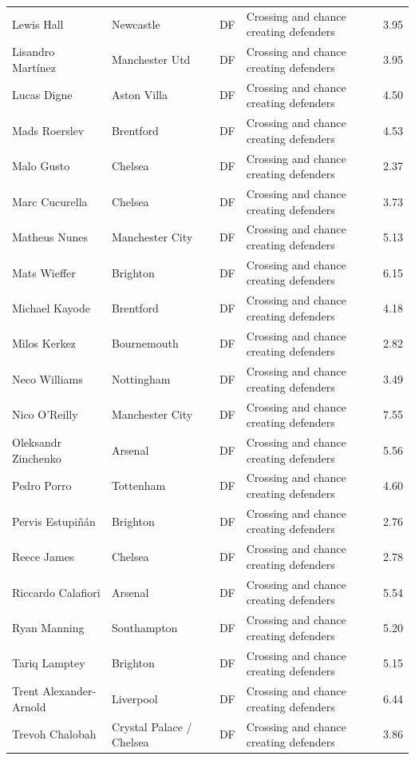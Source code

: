 \begin{longtable}{p{3.4cm}p{2.5cm}p{1.0cm}p{5.0cm}r}
Lewis Hall & Newcastle & DF & Crossing and chance creating defenders & 3.95 \\
Lisandro Martínez & Manchester Utd & DF & Crossing and chance creating defenders & 3.95 \\
Lucas Digne & Aston Villa & DF & Crossing and chance creating defenders & 4.50 \\
Mads Roerslev & Brentford & DF & Crossing and chance creating defenders & 4.53 \\
Malo Gusto & Chelsea & DF & Crossing and chance creating defenders & 2.37 \\
Marc Cucurella & Chelsea & DF & Crossing and chance creating defenders & 3.73 \\
Matheus Nunes & Manchester City & DF & Crossing and chance creating defenders & 5.13 \\
Mats Wieffer & Brighton & DF & Crossing and chance creating defenders & 6.15 \\
Michael Kayode & Brentford & DF & Crossing and chance creating defenders & 4.18 \\
Milos Kerkez & Bournemouth & DF & Crossing and chance creating defenders & 2.82 \\
Neco Williams & Nottingham & DF & Crossing and chance creating defenders & 3.49 \\
Nico O'Reilly & Manchester City & DF & Crossing and chance creating defenders & 7.55 \\
Oleksandr Zinchenko & Arsenal & DF & Crossing and chance creating defenders & 5.56 \\
Pedro Porro & Tottenham & DF & Crossing and chance creating defenders & 4.60 \\
Pervis Estupiñán & Brighton & DF & Crossing and chance creating defenders & 2.76 \\
Reece James & Chelsea & DF & Crossing and chance creating defenders & 2.78 \\
Riccardo Calafiori & Arsenal & DF & Crossing and chance creating defenders & 5.54 \\
Ryan Manning & Southampton & DF & Crossing and chance creating defenders & 5.20 \\
Tariq Lamptey & Brighton & DF & Crossing and chance creating defenders & 5.15 \\
Trent Alexander-Arnold & Liverpool & DF & Crossing and chance creating defenders & 6.44 \\
Trevoh Chalobah & Crystal Palace / Chelsea & DF & Crossing and chance creating defenders & 3.86 \\

\end{longtable}
